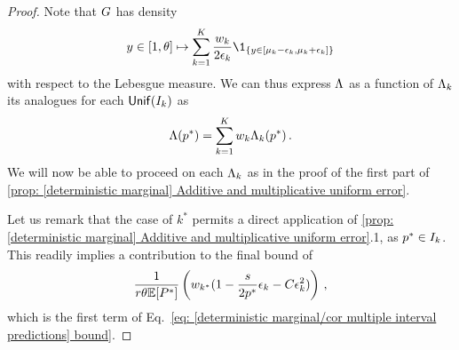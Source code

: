 \begin{proof}
 Note that $G$ has density
    \begin{align}
        \pred\in\range\mapsto\sum_{k=1}^K\frac{\weight_k}{2\epsilon_k} \1_{\{\pred\in[\locus_k-\epsilon_k,\locus_k+\epsilon_k]\}}
        \notag
    \end{align}
    with respect to the Lebesgue measure. We can thus express $\Lambda$ as a function of $\Lambda_k$ its analogues for each $\mbox{\textup{\textsf{Unif}}}(I_k)$ as
    \begin{align}
        \Lambda(p^*)=\sum_{k=1}^K w_k \Lambda_k(p^*)\,. \label{[deterministic marginal] cor multiinterval predictions | proof 1}
    \end{align}
    We will now be able to proceed on each $\Lambda_k$ as in the proof of the first part of \cref{prop: [deterministic marginal] Additive and multiplicative uniform error}. 
    
    Let us remark that the case of $k^*$ permits a direct application of \cref{prop: [deterministic marginal] Additive and multiplicative uniform error}.1, as $p^*\in I_k$. This readily implies a contribution to the final bound of
    \begin{align}
        \frac{1}{r\theta\mathbb{E}[P^*]}\left(w_{k^*}(1-\frac{s}{2p^*}\epsilon_k-C\epsilon_k^2)\right)\,,\label{eq: [deterministic marginal] cor multiinterval predictions | proof k star}
    \end{align}
    which is the first term of Eq.~\eqref{eq: [deterministic marginal/cor multiple interval predictions] bound}.


\end{proof}

